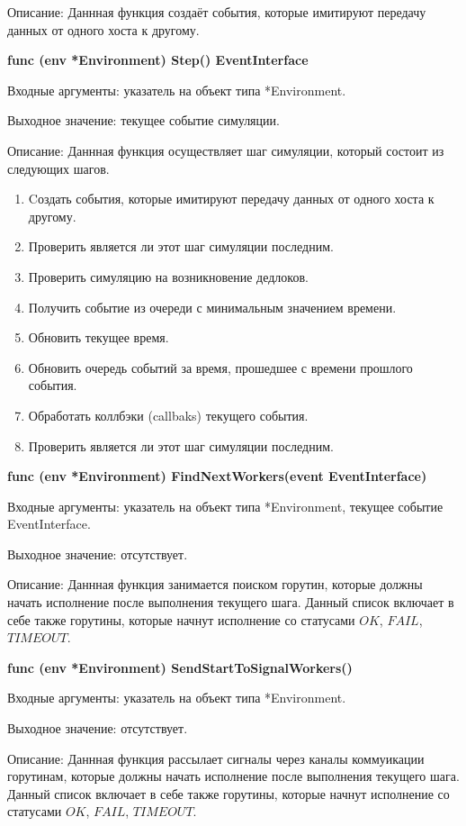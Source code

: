 Описание: Даннная функция создаёт события, которые имитируют передачу данных от одного хоста к другому.

\textbf{func (env *Environment) Step() EventInterface }

Входные аргументы: указатель на объект типа *Environment.

Выходное значение: текущее событие симуляции.

Описание: Даннная функция осуществляет шаг симуляции, который состоит из следующих шагов. 
\begin{enumerate}
\item Cоздать события, которые имитируют передачу данных от одного хоста к другому.
\item Проверить является ли этот шаг симуляции последним.
\item Проверить симуляцию на возникновение дедлоков.
\item Получить событие из очереди с минимальным значением времени.
\item Обновить текущее время.
\item Обновить очередь событий за время, прошедшее с времени прошлого события.
\item Обработать коллбэки (callbaks) текущего события.
\item Проверить является ли этот шаг симуляции последним.

\end{enumerate}

\textbf{func (env *Environment) FindNextWorkers(event EventInterface)}

Входные аргументы: указатель на объект типа *Environment, текущее событие EventInterface.

Выходное значение: отсутствует. 

Описание: Даннная функция занимается поиском горутин, которые должны начать исполнение после выполнения текущего шага. Данный список включает в себе также горутины, которые начнут исполнение со статусами $OK$, $FAIL$, $TIMEOUT$.

\textbf{func (env *Environment) SendStartToSignalWorkers()}

Входные аргументы: указатель на объект типа *Environment.

Выходное значение: отсутствует. 

Описание: Даннная функция рассылает сигналы через каналы коммуикации горутинам, которые должны начать исполнение после выполнения текущего шага. Данный список включает в себе также горутины, которые начнут исполнение со статусами $OK$, $FAIL$, $TIMEOUT$.

